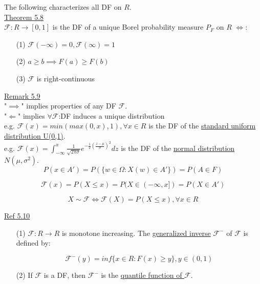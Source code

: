 \documentclass[10pt,letterpaper]{article}
\begin{document}
\pagebreak

The following characterizes all DF on $R$.\\

\underline{Theorem 5.8}\\

$\mathcal{F}:R\rightarrow [0,1]$ is the DF of a unique Borel probability measure $P_F$ on $R$ $\iff$:

\begin{enumerate}

\item[(1)] $\mathcal{F}(-\infty)=0, \mathcal{F}(\infty)=1$

\item[(2)] $a\geq b\implies F(a)\geq F(b)$

\item[(3)] $\mathcal{F}$ is right-continuous

\end{enumerate}

\underline{Remark 5.9}\\

"$\implies$" implies properties of any DF $\mathcal{F}$.\\

"$\Longleftarrow$" implies $\forall\mathcal{F}$:DF induces a unique distribution\\

e.g. $\mathcal{F}(x)=min(max(0,x),1), \forall x\in R$ is the DF of the \underline{standard uniform distribution U(0,1)}.\\

e.g. $\mathcal{F}(x)=\int_{-\infty}^x\frac{1}{\sqrt{2\pi\sigma}}e^{-\frac{1}{2}(\frac{z-\mu}{\sigma})^2}dz$ is the DF of the \underline{normal distribution $N(\mu, \sigma^2)$}.\\

$$P(x\in A')=P(\{w\in\Omega:X(w)\in A'\})=P(A\in F)$$

$$\mathcal{F}(x)=P(X\leq x)=P(X\in (-\infty,x])=P(X\in A')$$

$$X\sim\mathcal{F}\iff\mathcal{F}(X)=P(X\leq x), \forall x\in R$$

\underline{Ref 5.10}\\

\begin{enumerate}

\item[(1)] $\mathcal{F}:R\rightarrow R$ is monotone increasing. The \underline{generalized inverse} $\mathcal{F}^-$ of $\mathcal{F}$ is defined by:

$$\mathcal{F}^-(y)=inf\{x\in R: F(x)\geq y\}, y\in (0,1)$$

\item[(2)] If $\mathcal{F}$ is a DF, then $\mathcal{F}^-$ is the \underline{quantile function of $\mathcal{F}$}.

\end{enumerate}
\end{document}
